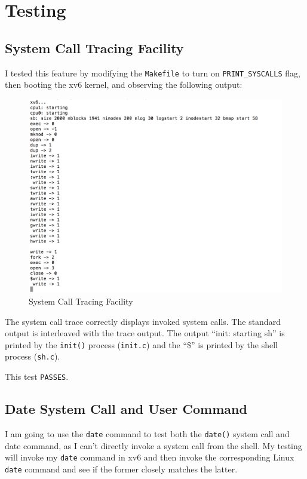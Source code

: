 \documentclass[11pt,letterpaper]{report}
\begin{document}
\newpage
	\section*{Testing}
	
	\subsection*{System Call Tracing Facility}
	I tested this feature by modifying the {\tt Makefile} to turn on {\tt PRINT\_SYSCALLS} flag, then booting the xv6 kernel, and observing the following output:
	
\begin{figure}[h!]
\centering
\includegraphics[width=0.8\linewidth]{sys-trace.png}
\caption[Syscall Trace]{System Call Tracing Facility}
\label{fig:syscalltrace}
\end{figure}
	
	The system call trace correctly displays invoked system calls. The standard output is interleaved with the trace output. The output ``init: starting sh'' is printed by the {\tt init()} process ({\tt init.c}) and the ``\$'' is printed by the shell process ({\tt sh.c}).
	
	This test {\tt PASSES}.

\newpage	
	\subsection*{Date System Call and User Command}
	I am going to use the {\tt date} command to test both the {\tt date()} system call and date command, as I can't directly invoke a system call from the shell. My testing will invoke my {\tt date} command in xv6 and then invoke the corresponding Linux {\tt date} command and see if the former closely matches the latter. 
	
\end{document}

